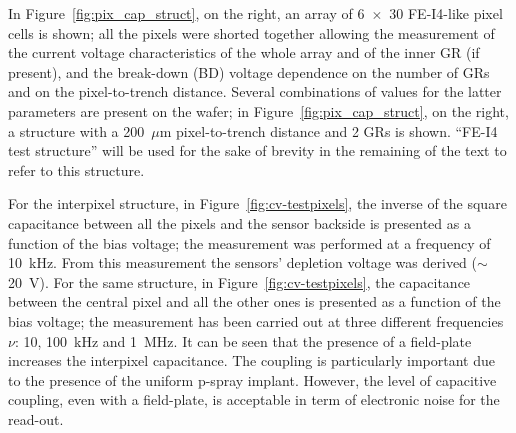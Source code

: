 In Figure~\ref{fig:pix_cap_struct}, on the right, an array of 6~$\times$~30 FE-I4-like
 pixel cells is shown; all the pixels were shorted together allowing the measurement of the current voltage characteristics  of the whole array and of the inner GR (if present),
 and the break-down (BD) voltage dependence on
 the number of GRs and on the pixel-to-trench distance. Several combinations of values for the latter parameters are present on the wafer; in
 Figure~\ref{fig:pix_cap_struct}, on the right, a structure with a 200~$\mu$m pixel-to-trench distance and 2 GRs is shown. ``FE-I4 test structure'' will be used for the sake of
 brevity in the remaining of the text to refer to this structure.

For the interpixel structure, in Figure~\ref{fig:cv-testpixels}, the inverse of the square
 capacitance between all the pixels and the sensor backside is presented
 as a function of the bias voltage; the measurement was performed at a frequency of 10~kHz. From this measurement the sensors' depletion voltage was derived ($\sim$20~V).
For the same structure, in Figure~\ref{fig:cv-testpixels}, the capacitance between the central pixel and  all the other ones 
 is presented as a function of the bias voltage; the measurement has been carried out at three different frequencies $\nu$: 10, 100~kHz and 1~MHz.
  It can be seen that the presence of a field-plate increases the interpixel capacitance. The coupling is particularly important due 
 to the presence of the uniform p-spray implant. However, the level of capacitive coupling, even with  a field-plate, is acceptable in term of electronic noise for the read-out.



